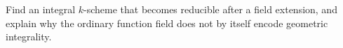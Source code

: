 \begin{problem}\label{chal:vi27-04}
Find an integral $k$-scheme that becomes reducible after a field extension, and explain why the ordinary function field does not by itself encode geometric integrality.
\end{problem}
